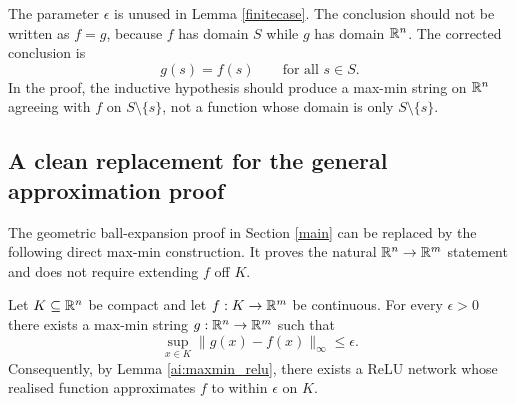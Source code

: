 \begin{remark}
The parameter $\epsilon$ is unused in Lemma \ref{finitecase}.  The conclusion should not be written as $f=g$, because $f$ has domain $S$ while $g$ has domain $\mathbb{R}^n$.  The corrected conclusion is
\[
g(s)=f(s)\qquad\text{for all }s\in S.
\]
In the proof, the inductive hypothesis should produce a max-min string on $\mathbb{R}^n$ agreeing with $f$ on $S\setminus\{s\}$, not a function whose domain is only $S\setminus\{s\}$.
\end{remark}

\subsection{A clean replacement for the general approximation proof}

The geometric ball-expansion proof in Section \ref{main} can be replaced by the following direct max-min construction.  It proves the natural $\mathbb{R}^n\to\mathbb{R}^m$ statement and does not require extending $f$ off $K$.

\begin{thm}
\label{ai:uniform_approximation}
Let $K\subseteq\mathbb{R}^n$ be compact and let $f:K\to\mathbb{R}^m$ be continuous.  For every $\epsilon>0$ there exists a max-min string $g:\mathbb{R}^n\to\mathbb{R}^m$ such that
\[
\sup_{x\in K}\lVert g(x)-f(x)\rVert_\infty\leq \epsilon.
\]
Consequently, by Lemma \ref{ai:maxmin_relu}, there exists a ReLU network whose realised function approximates $f$ to within $\epsilon$ on $K$.
\end{thm}

